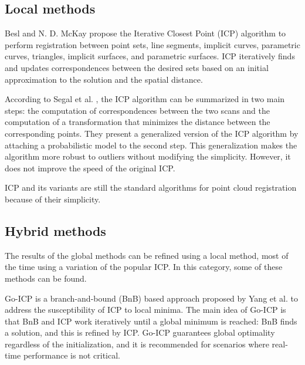         \subsection{Local methods} 

        Besl and N. D. McKay \cite{Besl_1992_amethod} propose the Iterative Closest Point (ICP) algorithm to perform registration 
        between point sets, line segments, implicit curves, parametric curves, triangles, implicit surfaces, and parametric surfaces.
        ICP iteratively finds and updates correspondences between the desired sets based on an initial approximation to the solution and 
        the spatial distance.

        According to Segal et al. \cite{Segal_2009_generalizedicp}, the ICP algorithm can be summarized in two main steps:
        the computation of correspondences between the two scans and 
        the computation of a transformation that minimizes the distance between the corresponding points.
        They present a generalized version of the ICP algorithm by attaching a probabilistic model to the second step.
        This generalization makes the algorithm more robust to outliers without modifying the simplicity. 
        However, it does not improve the speed of the original ICP.

        ICP and its variants are still the standard algorithms for point cloud registration because of their simplicity. 

        \subsection{Hybrid methods} 

        The results of the global methods can be refined using a local method, most of the time using a variation of the popular ICP.
        In this category, some of these methods can be found.

        Go-ICP is a branch-and-bound (BnB) based approach proposed by Yang et al. \cite{Yang_2016_goicp} to address the susceptibility of ICP to local minima. 
        The main idea of Go-ICP is that BnB and ICP work iteratively until a global minimum is reached: BnB finds a solution, and this is refined by ICP.
        Go-ICP guarantees global optimality regardless of the initialization, and it is recommended for scenarios where real-time performance is not critical.

